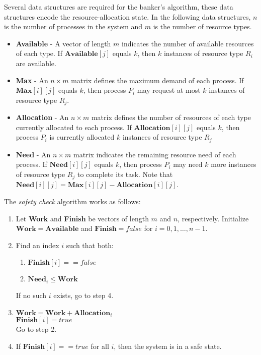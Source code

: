 Several data structures are required for the banker's algorithm,
these data structures encode the resource-allocation state.
In the following data structures, $n$ is the number of processes in the system and
$m$ is the number of resource types.
\begin{itemize}
    \item \textbf{Available} - A vector of length $m$ indicates the number of available resources of each type.
    If $\mathbf{Available}[j]$ equals $k$, then $k$ instances of resource type $R_i$ are available.
    \item \textbf{Max} - An $n \times m$ matrix defines the maximum demand of each process.
    If $\mathbf{Max}[i][j]$ equals $k$, then process $P_i$ may request at most $k$ instances of resource type $R_j$.
    \item \textbf{Allocation} - An $n \times m$ matrix defines the number of resources of each type currently allocated to each process.
    If $\mathbf{Allocation}[i][j]$ equals $k$, then process $P_i$ is currently allocated $k$ instances of resource type $R_j$
    \item \textbf{Need} - An $n \times m$ matrix indicates the remaining resource need of each process.
    If $\mathbf{Need}[i][j]$ equals $k$, then process $P_i$ may need $k$ more instances of resource type $R_j$ to complete its task.
    Note that $\mathbf{Need}[i][j] = \mathbf{Max}[i][j] - \mathbf{Allocation}[i][j]$.
\end{itemize}

The \textit{safety check} algorithm works as follows:
\begin{enumerate}
    \item Let \textbf{Work} and \textbf{Finish} be vectors of length $m$ and $n$, respectively.
    Initialize $\mathbf{Work} = \mathbf{Available}$ and $\mathbf{Finish} = false$ for $i = 0, 1, \dots, n - 1$.
    \item Find an index $i$ such that both:
    \begin{enumerate}
        \item $\mathbf{Finish}[i] == false$
        \item $\mathbf{Need}_i \le \mathbf{Work}$
    \end{enumerate}
    If no such $i$ exists, go to step 4.
    \item $\mathbf{Work} = \mathbf{Work} + \mathbf{Allocation}_i$\\
    $\mathbf{Finish}[i] = true$\\
    Go to step 2.
    \item If $\mathbf{Finish}[i] == true$ for all $i$, then the system is in a safe state.
\end{enumerate}

